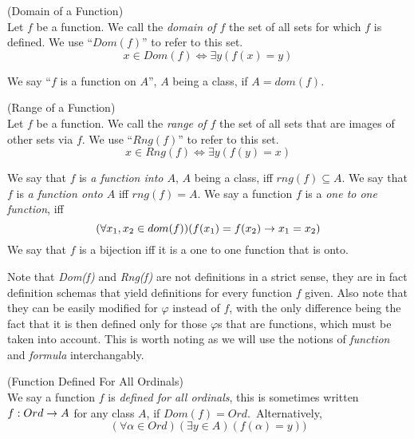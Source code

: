 \begin{definition}{(Domain of a Function)}\label{def:dom}\\
Let $f$ be a function. We call the \emph{domain of $f$} the set of all sets for which $f$ is defined. We use ``$Dom(f)$'' to refer to this set.
\begin{equation}
x \in Dom(f) \iff \exists y (f(x) = y)
\end{equation}
\end{definition}
We say ``$f$ is a function on $A$'', $A$ being a class, if $A = dom(f)$.

\begin{definition}{(Range of a Function)}\label{def:rng}\\
Let $f$ be a function. We call the \emph{range of $f$} the set of all sets that are images of other sets via $f$. We use ``$Rng(f)$'' to refer to this set. %
\begin{equation}
x \in Rng(f) \iff \exists y (f(y) = x)
\end{equation}
\end{definition}
We say that $f$ is \emph{a function into $A$}, $A$ being a class, iff $rng(f) \subseteq A$.
We say that $f$ is \emph{a function onto $A$} iff $rng(f) = A$. %
We say a function $f$ is a \emph{one to one function}, iff
\begin{equation}
(\forall x_1, x_2 \in dom(f))(f(x_1) = f(x_2) \rightarrow x_1 = x_2)
\end{equation}
We say that $f$ is a bijection iff it is a one to one function that is onto.

Note that \emph{Dom(f)} and \emph{Rng(f)} are not definitions in a strict sense, they are in fact definition schemas that yield definitions for every function $f$ given. Also note that they can be easily modified for $\varphi$ instead of $f$, with the only difference being the fact that it is then defined only for those $\varphi$s that are functions, which must be taken into account. This is worth noting as we will use the notions of \emph{function} and \emph{formula} interchangably.

\begin{definition}{(Function Defined For All Ordinals)}\label{def:function_dfao}\\
We say a function $f$ is \emph{defined for all ordinals}, this is sometimes written $f: Ord \rightarrow A$ for any class $A$, if $Dom(f) = Ord$.\
Alternatively,
\begin{equation}
(\forall \alpha \in Ord)(\exists y \in A)(f(\alpha) = y))
\end{equation}
\end{definition}

